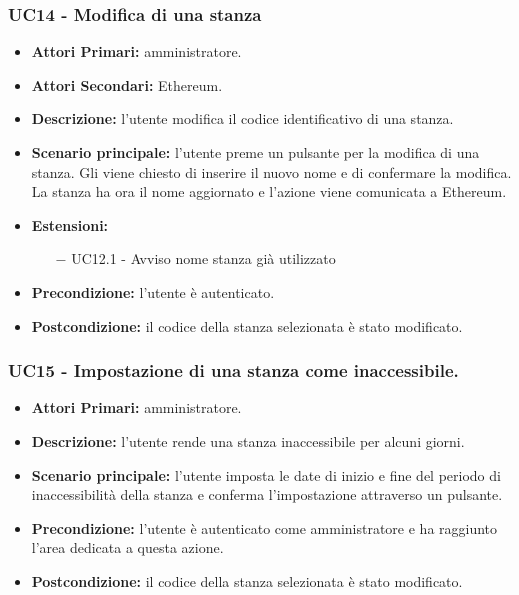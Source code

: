 \subsubsection{UC14 - Modifica di una stanza}
\begin{itemize}
	\item\textbf{Attori Primari:}
	amministratore.
	\item\textbf{Attori Secondari:}
	Ethereum.
	\item\textbf{Descrizione:}
	l'utente modifica il codice identificativo di una stanza.
	\item\textbf{Scenario principale:} 
	l'utente preme un pulsante per la modifica di una stanza. Gli viene chiesto di inserire il nuovo nome e di confermare la modifica. La stanza ha ora il nome aggiornato e l'azione viene comunicata a Ethereum.
	\item\textbf{Estensioni:}
	\begin{itemize}
		\item[$-$] UC12.1 - Avviso nome stanza già utilizzato
	\end{itemize}
	\item\textbf{Precondizione:} 
	l'utente è autenticato.
	\item\textbf{Postcondizione:}
	il codice della stanza selezionata è stato modificato.
\end{itemize}

\subsubsection{UC15 - Impostazione di una stanza come inaccessibile.}
\begin{itemize}
	\item\textbf{Attori Primari:}
	amministratore.
	\item\textbf{Descrizione:}
	l'utente rende una stanza inaccessibile per alcuni giorni.
	\item\textbf{Scenario principale:} 
	l'utente imposta le date di inizio e fine del periodo di inaccessibilità della stanza e conferma l'impostazione attraverso un pulsante.
	\item\textbf{Precondizione:} 
	l'utente è autenticato come amministratore e ha raggiunto l'area dedicata a questa azione.
	\item\textbf{Postcondizione:}
	il codice della stanza selezionata è stato modificato.
\end{itemize}

